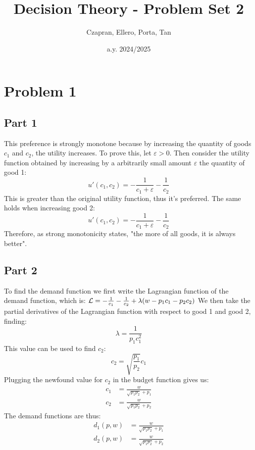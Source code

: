 \documentclass[12pt]{extarticle}
\title{Decision Theory - Problem Set 2}
\author{Czapran, Ellero, Porta, Tan}
\date{a.y. 2024/2025}
\numberwithin{table}{section}
\numberwithin{figure}{section}
\numberwithin{equation}{section}
\begin{document}
\maketitle

\section*{Problem 1}

\subsection*{Part 1}
This preference is strongly monotone because by increasing the quantity of goods $c_1$ and $c_2$, the utility increases.
To prove this, let $\varepsilon>0$.
Then consider the utility function obtained by increasing
by a arbitrarily small amount $\varepsilon$ the quantity of good 1:
\begin{equation}
    u'(c_1,c_2)=-\frac{1}{c_1+\varepsilon}-\frac{1}{c_2}
\end{equation}
This is greater than the original utility function, thus it's preferred. The same holds when increasing good 2:
\begin{equation}
    u'(c_1,c_2)=-\frac{1}{c_1+\varepsilon}-\frac{1}{c_2}
\end{equation}
Therefore, as strong monotonicity states, "the more of all goods, it is always better".

\subsection*{Part 2}
To find the demand function we first write the Lagrangian function of the demand function,
which is: ${\cal L}= -\frac{1}{c_1}-\frac{1}{c_2}+ \lambda(w-p_1c_1-p_2c_2)$
We then take the partial derivatives of the Lagrangian function with respect to good 1 and good 2, finding:
\begin{equation}
    \lambda= \frac{1}{p_1c_1^2}
\end{equation}
This value can be used to find $c_2$:
\begin{equation}
    c_2=\sqrt{\frac{p_1}{p_2}}c_1
\end{equation}
Plugging the newfound value for $c_2$ in the budget function gives us:
\begin{align}
    c_1 & = \frac{w}{\sqrt{p_1p_2}+p_1} \\
    c_2 & = \frac{w}{\sqrt{p_1p_2}+p_2}
\end{align}
The demand functions are thus:
\begin{align}
    d_1(p,w) & = \frac{w}{\sqrt{p_1p_2}+p_1} \\
    d_2(p,w) & = \frac{w}{\sqrt{p_1p_2}+p_2}
\end{align}
\end{document}
